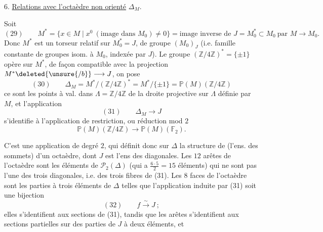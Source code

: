 
6. \uline{Relations avec l'octaèdre non orienté} $\Delta_M$.

Soit
\[
(29)\qquad
M^*=\{x\in M\mid x^0\ (\text{image dans }M_0)\ne0\}
=\text{image inverse de }J=M_0^*\subset M_0\ \text{par }M\longrightarrow M_0.
\]
Donc $M^*$ est un torseur relatif sur $M_0^*=J$, de groupe $(M_0)_J$ (i.e. famille constante de groupes isom. à $M_0$, indexée par $J$). Le groupe $(\mathbb{Z}/4\mathbb{Z})^*=\{\pm1\}$ opère sur $M^*$, de façon compatible avec la projection $M^*\deleted{\unsure{/b}}\longrightarrow J$, on pose
\[
(30)\qquad
\Delta_M=M^*/(\mathbb{Z}/4\mathbb{Z})^*=M^*/\{\pm1\}
=\mathbb{P}(M)(\mathbb{Z}/4\mathbb{Z})
\]
ce sont les points à val. dans $\Lambda=\mathbb{Z}/4\mathbb{Z}$ de la droite projective sur $\Lambda$ définie par $M$, et l'application 
\[
(31)\qquad \Delta_M\longrightarrow J
\]
s'identifie à l'application de restriction, ou réduction mod $2$
\[
\mathbb{P}(M)(\mathbb{Z}/4\mathbb{Z})\longrightarrow\mathbb{P}(M)(\mathbb{F}_2).
\]

C'est une application de degré $2$, qui définit donc sur $\Delta$ la structure de (l'ens. des sommets) d'un octaèdre, dont $J$ est l'ens des diagonales. Les
$12$ arêtes de l'octaèdre sont les éléments de $\mathcal P_2(\Delta)$ (qui a $\frac{6\cdot5}{2}=15$ éléments) qui ne sont pas  l'une des trois diagonales, i.e. des trois fibres de (31). Les $8$ faces de l'octaèdre sont les parties à trois éléments  de $\Delta$ telles que l'application induite par (31) soit une bijection
\[
(32)\qquad f\xrightarrow{\sim}J\ ;
\]
elles s'identifient aux sections de (31), tandis que les arêtes s'identifient aux sections partielles sur des parties de $J$ à deux éléments, et 
